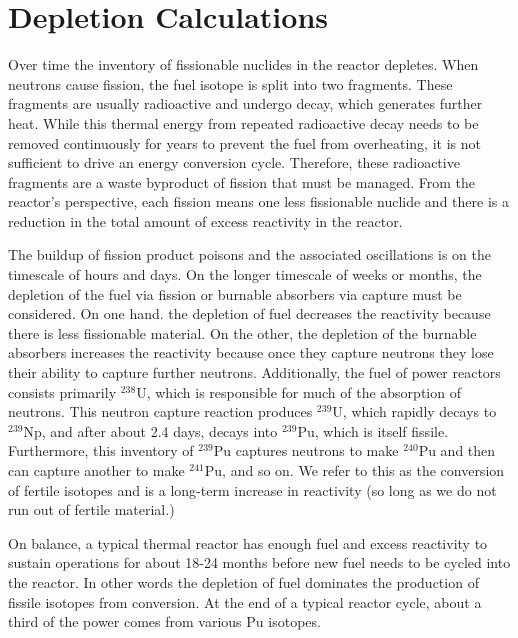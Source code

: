 \section{Depletion Calculations}

Over time the inventory of fissionable nuclides in the reactor depletes. When neutrons cause fission, the fuel isotope is split into two fragments. These fragments are usually radioactive and undergo decay, which generates further heat. While this thermal energy from repeated radioactive decay needs to be removed continuously for years to prevent the fuel from overheating, it is not sufficient to drive an energy conversion cycle. Therefore, these radioactive fragments are a waste byproduct of fission that must be managed. From the reactor's perspective, each fission means one less fissionable nuclide and there is a reduction in the total amount of excess reactivity in the reactor. 

The buildup of fission product poisons and the associated oscillations is on the timescale of hours and days. On the longer timescale of weeks or months, the depletion of the fuel via fission or burnable absorbers via capture must be considered. On one hand. the depletion of fuel decreases the reactivity because there is less fissionable material. On the other, the depletion of the burnable absorbers increases the reactivity because once they capture neutrons they lose their ability to capture further neutrons. Additionally, the fuel of power reactors consists primarily $^{238}$U, which is responsible for much of the absorption of neutrons. This neutron capture reaction produces $^{239}$U, which rapidly decays to $^{239}$Np, and after about 2.4 days, decays into $^{239}$Pu, which is itself fissile. Furthermore, this inventory of $^{239}$Pu captures neutrons to make $^{240}$Pu and then can capture another to make $^{241}$Pu, and so on. We refer to this as the conversion of fertile isotopes and is a long-term increase in reactivity (so long as we do not run out of fertile material.)

On balance, a typical thermal reactor has enough fuel and excess reactivity to sustain operations for about 18-24 months before new fuel needs to be cycled into the reactor. In other words the depletion of fuel dominates the production of fissile isotopes from conversion. At the end of a typical reactor cycle, about a third of the power comes from various Pu isotopes.

